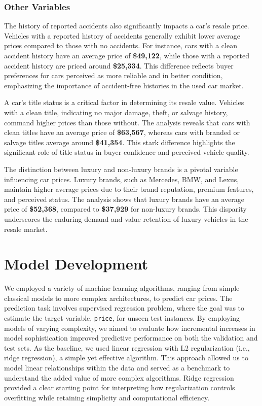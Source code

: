 \documentclass{article}
\begin{document}
\subsubsection{Other Variables}

The history of reported accidents also significantly impacts a car's resale price. Vehicles with a reported history of accidents generally exhibit lower average prices compared to those with no accidents. For instance, cars with a clean accident history have an average price of \textbf{\$49,122}, while those with a reported accident history are priced around \textbf{\$25,334}. This difference reflects buyer preferences for cars perceived as more reliable and in better condition, emphasizing the importance of accident-free histories in the used car market.

A car's title status is a critical factor in determining its resale value. Vehicles with a clean title, indicating no major damage, theft, or salvage history, command higher prices than those without. The analysis reveals that cars with clean titles have an average price of \textbf{\$63,567}, whereas cars with branded or salvage titles average around \textbf{\$41,354}. This stark difference highlights the significant role of title status in buyer confidence and perceived vehicle quality.

The distinction between luxury and non-luxury brands is a pivotal variable influencing car prices. Luxury brands, such as Mercedes, BMW, and Lexus, maintain higher average prices due to their brand reputation, premium features, and perceived status. The analysis shows that luxury brands have an average price of \textbf{\$52,368}, compared to \textbf{\$37,929} for non-luxury brands. This disparity underscores the enduring demand and value retention of luxury vehicles in the resale market.
\newpage
\section{Model Development}

We employed a variety of machine learning algorithms, ranging from simple classical models to more complex architectures, to predict car prices. The prediction task involves supervised regression problem, where the goal was to estimate the target variable, \texttt{price}, for unseen test instances. By employing models of varying complexity, we aimed to evaluate how incremental increases in model sophistication improved predictive performance on both the validation and test sets. As the baseline, we used linear regression with L2 regularization (i.e., ridge regression), a simple yet effective algorithm. This approach allowed us to model linear relationships within the data and served as a benchmark to understand the added value of more complex algorithms. Ridge regression provided a clear starting point for interpreting how regularization controls overfitting while retaining simplicity and computational efficiency.
\end{document}
